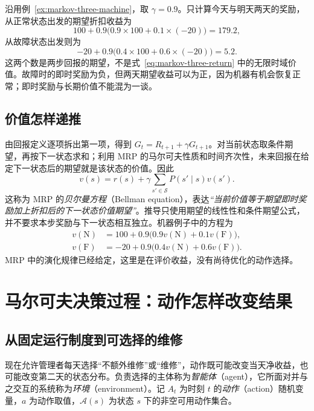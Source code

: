 \documentclass[UTF8,12pt,a4paper,fontset=fandol]{ctexart}
\begin{document}
\begin{example}[两天收益与一步收益的区别]
沿用例~\ref{ex:markov-three-machine}，取 $\gamma=0.9$。只计算今天与明天两天的奖励，从正常状态出发的期望折扣收益为
\[
  100+0.9\bigl(0.9\times100+0.1\times(-20)\bigr)=179.2,
\]
从故障状态出发则为
\[
  -20+0.9\bigl(0.4\times100+0.6\times(-20)\bigr)=5.2.
\]
这两个数是两步回报的期望，不是式~\eqref{eq:markov-three-return} 中的无限时域价值。故障时的即时奖励为负，但两天期望收益可以为正，因为机器有机会恢复正常；即时奖励与长期价值不能混为一谈。
\end{example}

\subsection{价值怎样递推}

由回报定义逐项拆出第一项，得到 $G_t=R_{t+1}+\gamma G_{t+1}$。对当前状态取条件期望，再按下一状态求和；利用 MRP 的马尔可夫性质和时间齐次性，未来回报在给定下一状态后的期望就是该状态的价值。因此
\begin{equation}
  v(s)=r(s)+\gamma\sum_{s'\in\mathcal S}P(s'\mid s)v(s').
  \label{eq:markov-three-mrp-bellman}
\end{equation}
这称为 MRP 的\emph{贝尔曼方程}（Bellman equation），表达\emph{“当前价值等于期望即时奖励加上折扣后的下一状态价值期望”}。推导只使用期望的线性性和条件期望公式，并不要求本步奖励与下一状态相互独立。机器例子中的方程为
\[
  \begin{aligned}
    v(\mathrm N)&=100+0.9\bigl(0.9v(\mathrm N)+0.1v(\mathrm F)\bigr),\\
    v(\mathrm F)&=-20+0.9\bigl(0.4v(\mathrm N)+0.6v(\mathrm F)\bigr).
  \end{aligned}
\]
MRP 中的演化规律已经给定，这里是在评价收益，没有尚待优化的动作选择。

\section{马尔可夫决策过程：动作怎样改变结果}
\label{sec:markov-three-mdp}

\subsection{从固定运行制度到可选择的维修}

现在允许管理者每天选择“不额外维修”或“维修”，动作既可能改变当天净收益，也可能改变第二天的状态分布。负责选择的主体称为\emph{智能体}（agent），它所面对并与之交互的系统称为\emph{环境}（environment）。记 $A_t$ 为时刻 $t$ 的\emph{动作}（action）随机变量，$a$ 为动作取值，$\mathcal A(s)$ 为状态 $s$ 下的非空可用动作集合。
\end{document}
